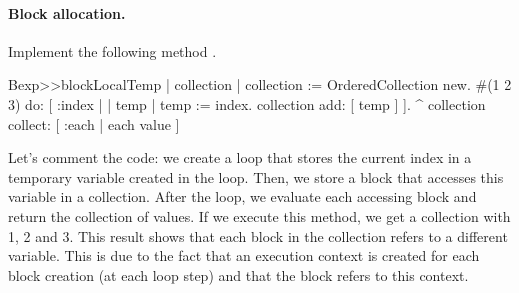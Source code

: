 \documentclass[a4paper,10pt,twoside]{book}
\begin{document}
\paragraph{Block allocation.} Implement the following method .

\begin{code}{}
Bexp>>blockLocalTemp
	| collection |
	collection := OrderedCollection new.
	#(1 2 3) do: [ :index |
		| temp |
		temp := index.
		collection add: [ temp ] ].
	^ collection collect: [ :each | each value ]
\end{code}

Let's comment the code: we create a loop that stores the current index in a temporary variable  created in the loop. Then, we store a block that accesses this variable in a collection. After the loop, we evaluate each accessing block and return the collection of values. If we execute this method, we get a collection with 1, 2 and 3. This result shows that each block in the collection refers to a different  variable.
This is due to the fact that an execution context is created for each block creation (at each loop step) and that the block \ct{[ temp ]} refers to this context.

\end{document}
